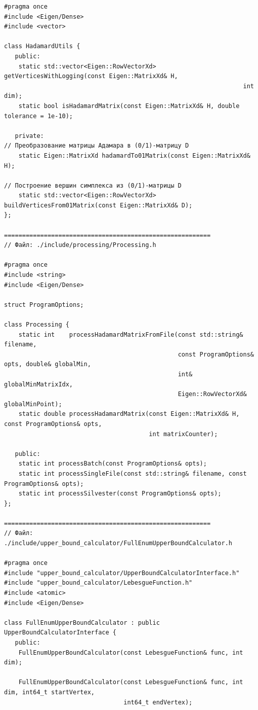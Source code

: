 \documentclass[a4paper,12pt]{article}
\begin{document}
\begin{lstlisting}
#pragma once
#include <Eigen/Dense>
#include <vector>

class HadamardUtils {
   public:
    static std::vector<Eigen::RowVectorXd> getVerticesWithLogging(const Eigen::MatrixXd& H,
                                                                  int                    dim);
    static bool isHadamardMatrix(const Eigen::MatrixXd& H, double tolerance = 1e-10);

   private:
// Преобразование матрицы Адамара в (0/1)-матрицу D
    static Eigen::MatrixXd hadamardTo01Matrix(const Eigen::MatrixXd& H);

// Построение вершин симплекса из (0/1)-матрицы D
    static std::vector<Eigen::RowVectorXd> buildVerticesFrom01Matrix(const Eigen::MatrixXd& D);
};

=========================================================
// Файл: ./include/processing/Processing.h

#pragma once
#include <string>
#include <Eigen/Dense>

struct ProgramOptions;

class Processing {
    static int    processHadamardMatrixFromFile(const std::string&    filename,
                                                const ProgramOptions& opts, double& globalMin,
                                                int&                globalMinMatrixIdx,
                                                Eigen::RowVectorXd& globalMinPoint);
    static double processHadamardMatrix(const Eigen::MatrixXd& H, const ProgramOptions& opts,
                                        int matrixCounter);

   public:
    static int processBatch(const ProgramOptions& opts);
    static int processSingleFile(const std::string& filename, const ProgramOptions& opts);
    static int processSilvester(const ProgramOptions& opts);
};

=========================================================
// Файл: ./include/upper_bound_calculator/FullEnumUpperBoundCalculator.h

#pragma once
#include "upper_bound_calculator/UpperBoundCalculatorInterface.h"
#include "upper_bound_calculator/LebesgueFunction.h"
#include <atomic>
#include <Eigen/Dense>

class FullEnumUpperBoundCalculator : public UpperBoundCalculatorInterface {
   public:
    FullEnumUpperBoundCalculator(const LebesgueFunction& func, int dim);

    FullEnumUpperBoundCalculator(const LebesgueFunction& func, int dim, int64_t startVertex,
                                 int64_t endVertex);


\end{lstlisting}
\end{document}
